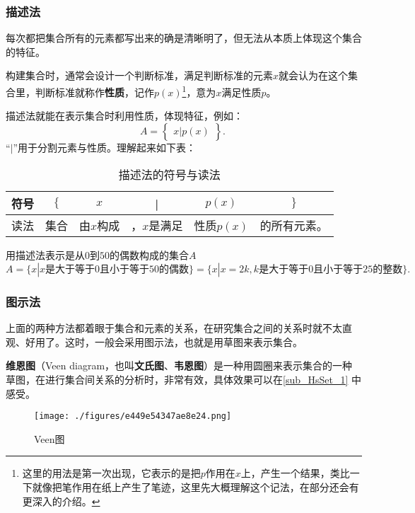 \subsubsection{描述法}

每次都把集合所有的元素都写出来的确是清晰明了，但无法从本质上体现这个集合的特征。

构建集合时，通常会设计一个判断标准，满足判断标准的元素$x$就会认为在这个集合里，判断标准就称作\textbf{性质}，记作$p(x)$\footnote{这里的用法是第一次出现，它表示的是把$p$作用在$x$上，产生一个结果，类比一下就像把笔作用在纸上产生了笔迹，这里先大概理解这个记法，在部分还会有更深入的介绍。}，意为$x$满足性质$p$。

描述法就能在表示集合时利用性质，体现特征，例如：
\begin{equation}
A=\begin{Bmatrix} x|p(x) \end{Bmatrix}.~
\end{equation}
“$|$”用于分割元素与性质。理解起来如下表：
\begin{table}[h]
\caption{描述法的符号与读法}\label{tab_HsSet1}
\centering
\begin{tabular}{|c|c|c|c|c|c|}
\hline
符号 & $\{$&$x$ &|& $p(x)$&$\}$ \\
\hline
读法 & 集合&由$x$构成&，$x$是满足& 性质$p(x)$&的所有元素。 \\
\hline
\end{tabular}
\end{table}

\begin{example}{用描述法表示是从$0$到$50$的偶数构成的集合$A$}
$$A=\{x|x\text{是大于等于}0\text{且小于等于}50\text{的偶数}\}=\{x|x=2k,k\text{是大于等于}0\text{且小于等于}25\text{的整数}\}.~$$
\end{example}

\subsubsection{图示法}
上面的两种方法都着眼于集合和元素的关系，在研究集合之间的关系时就不太直观、好用了。这时，一般会采用图示法，也就是用草图来表示集合。

\textbf{维恩图}（Veen diagram，也叫\textbf{文氏图}、\textbf{韦恩图}）是一种用圆圈来表示集合的一种草图，在进行集合间关系的分析时，非常有效，具体效果可以在\autoref{sub_HsSet_1} 中感受。
\begin{figure}[ht]
\centering
\texttt{[image: ./figures/e449e54347ae8e24.png]}
\caption{Veen图} \label{fig_SufCnd_1}
\end{figure}

